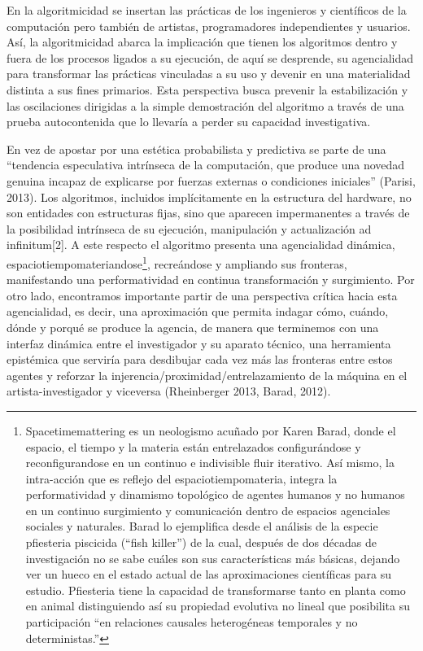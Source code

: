 En la algoritmicidad se insertan las prácticas de los ingenieros y científicos de la computación pero también de artistas, programadores independientes y usuarios. Así, la algoritmicidad abarca la implicación que tienen los algoritmos dentro y fuera de los procesos ligados a su ejecución, de aquí se desprende, su agencialidad para transformar las prácticas vinculadas a su uso y devenir en una materialidad distinta a sus fines primarios. Esta perspectiva busca prevenir la estabilización y las oscilaciones dirigidas a la simple demostración del algoritmo a través de una prueba autocontenida que lo llevaría a perder su capacidad investigativa.

En vez de apostar por una estética probabilista y predictiva se parte de una “tendencia especulativa intrínseca de la computación, que produce una novedad genuina incapaz de explicarse por fuerzas externas o condiciones iniciales” (Parisi, 2013). Los algoritmos, incluidos implícitamente en la estructura del hardware, no son entidades con estructuras fijas, sino que aparecen impermanentes a través de la posibilidad intrínseca de su ejecución, manipulación y actualización ad infinitum[2]. A este respecto el algoritmo presenta una agencialidad dinámica, espaciotiempomateriandose\footnote{Spacetimemattering es un neologismo acuñado por Karen Barad, donde el espacio, el tiempo y la materia están entrelazados configurándose y reconfigurandose en un continuo e indivisible fluir iterativo. Así mismo, la intra-acción que es reflejo del espaciotiempomateria, integra la performatividad y dinamismo topológico de agentes humanos y no humanos en un continuo surgimiento y comunicación dentro de espacios agenciales sociales y naturales. Barad lo ejemplifica desde el análisis de la especie pfiesteria piscicida (“fish killer”) de la cual, después de dos décadas de investigación no se sabe cuáles son sus características más básicas, dejando ver un hueco en el estado actual de las aproximaciones científicas para su estudio. Pfiesteria tiene la capacidad de transformarse tanto en planta como en animal distinguiendo así su propiedad evolutiva no lineal que posibilita su participación “en relaciones causales heterogéneas temporales y no deterministas.”}, recreándose y ampliando sus fronteras, manifestando una performatividad en continua transformación y surgimiento. Por otro lado, encontramos importante partir de una perspectiva crítica hacia esta agencialidad, es decir, una aproximación que permita indagar cómo, cuándo, dónde y porqué se produce la agencia, de manera que terminemos con una interfaz dinámica entre el investigador y su aparato técnico, una herramienta epistémica que serviría para desdibujar cada vez más las fronteras entre estos agentes y reforzar la injerencia/proximidad/entrelazamiento de la máquina en el artista-investigador y viceversa (Rheinberger 2013, Barad, 2012).

